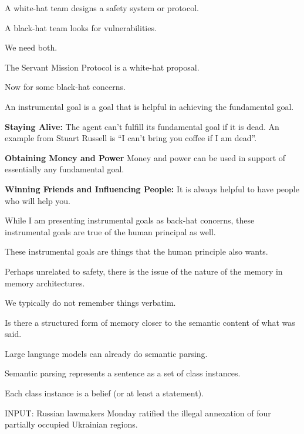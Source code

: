 {

A white-hat team designs a safety system or protocol.

\vfill
A black-hat team looks for vulnerabilities.

\vfill
We need both.

\vfill
The Servant Mission Protocol is a white-hat proposal.

\vfill
Now for some black-hat concerns.


An instrumental goal is a goal that is helpful in achieving the fundamental goal.

\vfill
{\bf Staying Alive:} The agent can't fulfill its fundamental goal if it is dead.  An example from Stuart Russell is ``I can't bring you coffee if I am dead''.

\vfill
{\bf Obtaining Money and Power} Money and power can be used in support of essentially any fundamental goal.

\vfill
{\bf Winning Friends and Influencing People:}  It is always helpful to have people who will help you.


While I am presenting instrumental goals as back-hat concerns, these instrumental goals are true of the human principal as well.

\vfill
These instrumental goals are things that the human principle also wants.


Perhaps unrelated to safety, there is the issue of the nature of the memory
in memory architectures.

\vfill
We typically do not remember things verbatim.

\vfill
Is there a structured form of memory closer to the semantic content of what was said.


Large language models can already do semantic parsing.

\vfill
Semantic parsing represents a sentence as a set of class instances.

\vfill
Each class instance is a belief (or at least a statement).



INPUT: Russian lawmakers Monday ratified the illegal annexation of four partially occupied Ukrainian regions.

}
